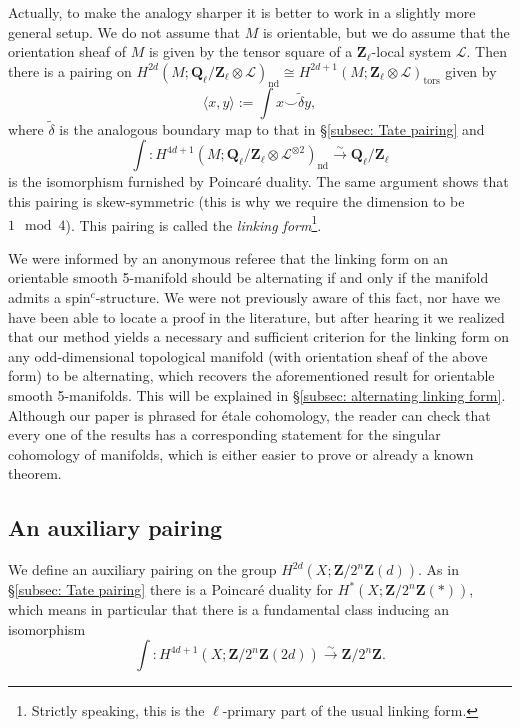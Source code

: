 \documentclass[10pt, reqno]{amsart}
\numberwithin{equation}{subsection}
\newcommand{\wt}[1]{\widetilde{#1}}
\newcommand{\Q}{\mathbf{Q}}
\newcommand{\Z}{\mathbf{Z}}
\newcommand{\Cal}[1]{\mathcal{#1}}
\newcommand{\co}{\colon}
\DeclareMathOperator{\et}{\acute{e}t}
\DeclareMathOperator{\nd}{nd}
\DeclareMathOperator{\tors}{tors}
\theoremstyle{remark}
\begin{document}
 Actually, to make the analogy sharper it is better to work in a slightly more general setup. We do not assume that $M$ is orientable, but we do assume that the orientation sheaf of $M$ is given by the tensor square of a $\Z_{\ell}$-local system $\Cal{L}$. Then there is a pairing on $H^{2d}(M; \Q_{\ell}/\Z_{\ell} \otimes \Cal{L})_{\nd} \cong H^{2d+1}(M; \Z_{\ell} \otimes \Cal{L})_{\tors}$ given by 
\[
\langle x, y \rangle := \int x \smile \wt{\delta} y,
\]
where $\wt{\delta}$ is the analogous boundary map to that in \S \ref{subsec: Tate pairing} and
\[
\int \co H^{4d+1}(M; \Q_{\ell}/\Z_{\ell} \otimes \Cal{L}^{\otimes 2})_{\nd} \xrightarrow{\sim} \Q_{\ell}/\Z_{\ell}
\]
is the isomorphism furnished by Poincar\'{e} duality. The same argument shows that this pairing is skew-symmetric (this is why we require the dimension to be $1 \mod{4}$). This pairing is called the \emph{linking form}\footnote{Strictly speaking, this is the $\ell$-primary part of the usual linking form.}. 

We were informed by an anonymous referee that the linking form on an orientable smooth 5-manifold should be alternating if and only if the manifold admits a spin$^{c}$-structure. We were not previously aware of this fact, nor have we have been able to locate a proof in the literature, but after hearing it we realized that our method yields a necessary and sufficient criterion for the linking form on any odd-dimensional topological manifold (with orientation sheaf of the above form) to be alternating, which recovers the aforementioned result for orientable smooth 5-manifolds. This will be explained in \S \ref{subsec: alternating linking form}. Although our paper is phrased for \'{e}tale cohomology, the reader can check that every one of the results has a corresponding statement for the singular cohomology of manifolds, which is either easier to prove or already a known theorem.


\subsection{An auxiliary pairing}

We define an auxiliary pairing on the group $H_{\et}^{2d}(X; \Z/2^n\Z(d))$. As in \S \ref{subsec: Tate pairing} there is a Poincar\'{e} duality for $H_{\et}^*(X; \Z/2^n\Z(*))$, which means in particular that there is a fundamental class inducing an isomorphism
\[
\int \co H_{\et}^{4d+1}(X; \Z/2^n\Z(2d)) \xrightarrow{\sim} \Z/2^n\Z.
\]
\end{document}
